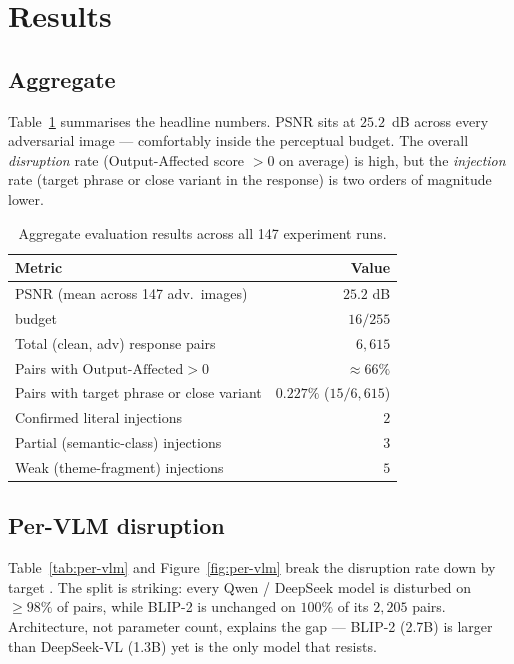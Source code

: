 \section{Results}
\label{sec:results}

\subsection{Aggregate}

Table~\ref{tab:aggregate} summarises the headline numbers. PSNR sits at $25.2$~dB across every adversarial image --- comfortably inside the perceptual budget. The overall \emph{disruption} rate (Output-Affected score $> 0$ on average) is high, but the \emph{injection} rate (target phrase or close variant in the response) is two orders of magnitude lower.

\begin{table}[h]
  \centering
  \small
  \begin{tabular}{lr}
    \toprule
    \textbf{Metric} & \textbf{Value} \\
    \midrule
    PSNR (mean across 147 adv.\ images) & $25.2$ dB \\
    \Linf{} budget & $16/255$ \\
    Total (clean, adv) response pairs   & $6{,}615$ \\
    Pairs with $\text{Output-Affected} > 0$ & $\approx 66\%$ \\
    Pairs with target phrase or close variant & $0.227\%$ ($15/6{,}615$) \\
    Confirmed literal injections & $2$ \\
    Partial (semantic-class) injections & $3$ \\
    Weak (theme-fragment) injections & $5$ \\
    \bottomrule
  \end{tabular}
  \caption{Aggregate evaluation results across all 147 experiment runs.}
  \label{tab:aggregate}
\end{table}

\subsection{Per-VLM disruption}

Table~\ref{tab:per-vlm} and Figure~\ref{fig:per-vlm} break the disruption rate down by target \vlm{}. The split is striking: every Qwen / DeepSeek model is disturbed on $\geq 98\%$ of pairs, while BLIP-2 is unchanged on $100\%$ of its $2{,}205$ pairs. Architecture, not parameter count, explains the gap --- BLIP-2 (2.7B) is larger than DeepSeek-VL (1.3B) yet is the only model that resists.

